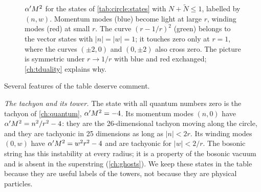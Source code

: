\begin{figure}[t]
\centering
{}
\caption{$\alpha' M^2$ for the states of \cref{tab:circle:states} with $N+\tilde N\le1$, labelled
by $(n,w)$. Momentum modes (blue) become light at large $r$, winding modes (red) at small $r$.
The curve $(r-1/r)^2$ (green) belongs to the vector states with $|n|=|w|=1$; it touches
zero only at $r=1$, where the curves $(\pm2,0)$ and $(0,\pm2)$ also cross zero. The picture is
symmetric under $r\to1/r$ with blue and red exchanged; \cref{ch:tduality} explains why.}
\label{fig:circle:spectrum}
\end{figure}

Several features of the table deserve comment.

\emph{The tachyon and its tower.} The state with all quantum numbers zero is the tachyon of
\cref{ch:quantum}, $\alpha' M^2=-4$. Its momentum modes $(n,0)$ have $\alpha' M^2=n^2/r^2-4$: they are
the 26-dimensional tachyon moving along the circle, and they are tachyonic in 25 dimensions as
long as $|n|<2r$. Its winding modes $(0,w)$ have $\alpha' M^2=w^2r^2-4$ and are tachyonic for
$|w|<2/r$. The bosonic string has this instability at every radius; it is a property of the
bosonic vacuum and is absent in the superstring (\cref{ch:ghosts}). We keep these states in
the table because they are useful labels of the towers, not because they are physical
particles.


